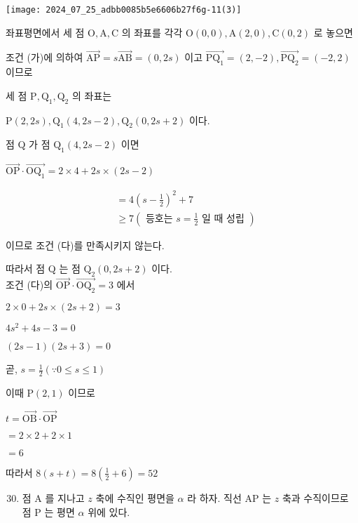 \documentclass[10pt]{article}
\begin{document}
\begin{center}
\texttt{[image: 2024\_07\_25\_adbb0085b5e6606b27f6g-11(3)]}
\end{center}

좌표평면에서 세 점 $\mathrm{O}, \mathrm{A}, \mathrm{C}$ 의 좌표를 각각 $\mathrm{O}(0,0), \mathrm{A}(2,0), \mathrm{C}(0,2)$ 로 놓으면

조건 (가)에 의하여 $\overrightarrow{\mathrm{AP}}=s \overrightarrow{\mathrm{AB}}=(0,2 s)$ 이고 $\overrightarrow{\mathrm{PQ}_{1}}=(2,-2), \overrightarrow{\mathrm{PQ}_{2}}=(-2,2)$ 이므로

세 점 $\mathrm{P}, \mathrm{Q}_{1}, \mathrm{Q}_{2}$ 의 좌표는

$\mathrm{P}(2,2 s), \mathrm{Q}_{1}(4,2 s-2), \mathrm{Q}_{2}(0,2 s+2)$ 이다.

점 Q 가 점 $\mathrm{Q}_{1}(4,2 s-2)$ 이면

$\overrightarrow{\mathrm{OP}} \cdot \overrightarrow{\mathrm{OQ}_{1}}=2 \times 4+2 s \times(2 s-2)$

\[
\begin{aligned}
& =4\left(s-\frac{1}{2}\right)^{2}+7 \\
& \geq 7\left(\text { 등호는 } s=\frac{1}{2} \text { 일 때 성립 }\right)
\end{aligned}
\]

이므로 조건 (다)를 만족시키지 않는다.

따라서 점 Q 는 점 $\mathrm{Q}_{2}(0,2 s+2)$ 이다.\\
조건 (다)의 $\overrightarrow{\mathrm{OP}} \cdot \overrightarrow{\mathrm{OQ}_{2}}=3$ 에서

$2 \times 0+2 s \times(2 s+2)=3$

$4 s^{2}+4 s-3=0$

$(2 s-1)(2 s+3)=0$

곧, $s=\frac{1}{2}(\because 0 \leq s \leq 1)$

이때 $\mathrm{P}(2,1)$ 이므로

$t=\overrightarrow{\mathrm{OB}} \cdot \overrightarrow{\mathrm{OP}}$

$=2 \times 2+2 \times 1$

$=6$

따라서 $8(s+t)=8\left(\frac{1}{2}+6\right)=52$

\begin{enumerate}
  \setcounter{enumi}{29}
  \item 점 A 를 지나고 $z$ 축에 수직인 평면을 $\alpha$ 라 하자. 직선 AP 는 $z$ 축과 수직이므로 점 P 는 평면 $\alpha$ 위에 있다.
\end{enumerate}
\end{document}
